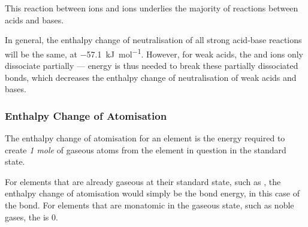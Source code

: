 			\pagebreak
			This reaction between  ions and  ions underlies the majority of reactions between acids and bases.



			In general, the enthalpy change of neutralisation of all strong acid-base reactions will be the same,
			at \SI{-57.1}{\kilo\joule\per\mole}. However, for weak acids, the  and  ions only dissociate
			partially --- energy is thus needed to break these partially dissociated bonds, which decreases the enthalpy change
			of neutralisation of weak acids and bases.





		\subsubsection{Enthalpy Change of Atomisation}

			The enthalpy change of atomisation for an element is the energy required to create \emph{1 mole} of gaseous atoms from the
			element in question in the standard state.


			For elements that are already gaseous at their standard state, such as , the enthalpy change of atomisation would
			simply be the bond energy, in this case of the  bond. For elements that are monatomic in the gaseous state,
			such as noble gases, the  is 0.


